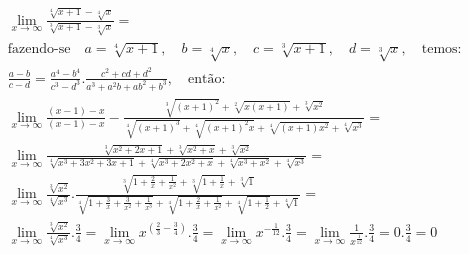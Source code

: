 \begin{ex}
\begin{align}	
&\lim_{x\rightarrow \infty} \frac{\sqrt[4]{x+1}-\sqrt[4]{x}}{\sqrt[3]{x+1}-\sqrt[3]{x}}=\nonumber\\
&\text{fazendo-se} \quad a=\sqrt[4]{x+1},\quad b=\sqrt[4]{x},\quad c=\sqrt[3]{x+1},\quad d=\sqrt[3]{x},\quad \text{temos:}\nonumber\\
&\frac{a-b}{c-d}=\frac{a^4-b^4}{c^3-d^3}.\frac{c^2+cd+d^2}{a^3+a^2b+ab^2+b^3},\quad\text{então}:\nonumber\\
&\lim_{x\rightarrow \infty} \frac{(x-1)-x}{(x-1)-x}-\frac{\sqrt[3]{(x+1)^2}+\sqrt[2]{x(x+1)}+\sqrt[3]{x^2}}{\sqrt[4]{(x+1)^3}+\sqrt[4]{(x+1)^2x}+\sqrt[4]{(x+1)x^2}+\sqrt[4]{x^3}}=\nonumber\\
&\lim_{x\rightarrow \infty} \frac{\sqrt[3]{x^2+2x+1}+\sqrt[3]{x^2+x}+\sqrt[3]{x^2}}{\sqrt[4]{x^3+3x^2+3x+1}+\sqrt[4]{x^3+2x^2+x}+\sqrt[4]{x^3+x^2}+\sqrt[4]{x^3}}=\nonumber\\
&\lim_{x\rightarrow \infty} \frac{\sqrt[3]{x^2}}{\sqrt[4]{x^3}}.\frac{\sqrt[3]{1+\frac{2}{x}+\frac{1}{x^2}}+\sqrt[3]{1+\frac{1}{x}}+\sqrt[3]{1}}{\sqrt[4]{1+\frac{3}{x}+\frac{3}{x^2}+\frac{1}{x^3}}+\sqrt[4]{1+\frac{2}{x}+\frac{1}{x^2}}+\sqrt[4]{1+\frac{1}{2}}+\sqrt[4]{1}}=\nonumber\\
&\lim_{x\rightarrow \infty} \frac{\sqrt[3]{x^2}}{\sqrt[4]{x^3}}.\frac{3}{4}=\lim_{x\rightarrow \infty} x^{(\frac{2}{3}-\frac{3}{4})}.\frac{3}{4}=\lim_{x\rightarrow \infty} x^{-\frac{1}{12}}.\frac{3}{4}=\lim_{x\rightarrow \infty}\frac{1}{x^\frac{1}{12}}.\frac{3}{4}=0.\frac{3}{4}=0 \nonumber
\end{align}
\end{ex}